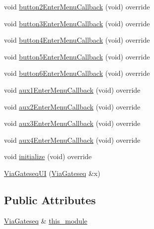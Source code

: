 \begin{DoxyCompactItemize}
void \mbox{\hyperlink{class_via_gateseq_1_1_via_gateseq_u_i_ae0e3038febadb4cde08ff0f3da2703fe}{button2\+Enter\+Menu\+Callback}} (void) override
\item 
void \mbox{\hyperlink{class_via_gateseq_1_1_via_gateseq_u_i_a634b6fe2c13f90490b6e8182b4854425}{button3\+Enter\+Menu\+Callback}} (void) override
\item 
void \mbox{\hyperlink{class_via_gateseq_1_1_via_gateseq_u_i_a2f739b43b005baf5bc8dd4d081c5b6d5}{button4\+Enter\+Menu\+Callback}} (void) override
\item 
void \mbox{\hyperlink{class_via_gateseq_1_1_via_gateseq_u_i_a6286441705681c57d4f8535d0445b360}{button5\+Enter\+Menu\+Callback}} (void) override
\item 
void \mbox{\hyperlink{class_via_gateseq_1_1_via_gateseq_u_i_adf289572ed287fdc4c9ff4029f008b7b}{button6\+Enter\+Menu\+Callback}} (void) override
\item 
void \mbox{\hyperlink{class_via_gateseq_1_1_via_gateseq_u_i_ae1a1c7c97151e09b2e6b136f0c1efe6e}{aux1\+Enter\+Menu\+Callback}} (void) override
\item 
void \mbox{\hyperlink{class_via_gateseq_1_1_via_gateseq_u_i_a3f3270689385b4ba7449599538aafc59}{aux2\+Enter\+Menu\+Callback}} (void) override
\item 
void \mbox{\hyperlink{class_via_gateseq_1_1_via_gateseq_u_i_a8235806bb28a40062b89b1cb9c83e3b0}{aux3\+Enter\+Menu\+Callback}} (void) override
\item 
void \mbox{\hyperlink{class_via_gateseq_1_1_via_gateseq_u_i_a78f330f4c02acb69f9c2321a8187f8dc}{aux4\+Enter\+Menu\+Callback}} (void) override
\item 
void \mbox{\hyperlink{class_via_gateseq_1_1_via_gateseq_u_i_ae59b0d739f92892cf9a0d16cd3d25bfa}{initialize}} (void) override
\item 
\mbox{\hyperlink{class_via_gateseq_1_1_via_gateseq_u_i_a907e06009edfea0251dbe3c00c84bcf6}{Via\+Gateseq\+UI}} (\mbox{\hyperlink{class_via_gateseq}{Via\+Gateseq}} \&x)
\end{DoxyCompactItemize}
\subsection*{Public Attributes}
\begin{DoxyCompactItemize}
\item 
\mbox{\hyperlink{class_via_gateseq}{Via\+Gateseq}} \& \mbox{\hyperlink{class_via_gateseq_1_1_via_gateseq_u_i_ae51cc27ec70247c3fc7a013e20a80450}{this\+\_\+module}}
\end{DoxyCompactItemize}


